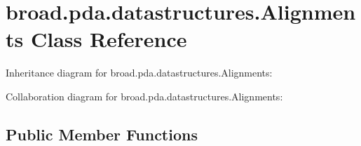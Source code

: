 \hypertarget{classbroad_1_1pda_1_1datastructures_1_1_alignments}{\section{broad.\+pda.\+datastructures.\+Alignments Class Reference}
\label{classbroad_1_1pda_1_1datastructures_1_1_alignments}
}


Inheritance diagram for broad.\+pda.\+datastructures.\+Alignments\+:


Collaboration diagram for broad.\+pda.\+datastructures.\+Alignments\+:
\subsection*{Public Member Functions}
